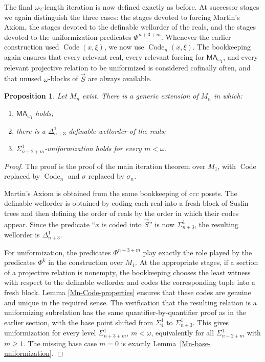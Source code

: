 \documentclass[a4paper,11pt]{article}
\newtheorem{proposition}[theorem]{Proposition}
\newcommand{\MA}{\mathsf{MA_{\omega_1}}}
\begin{document}
The final $\omega_2$-length iteration is now defined exactly as before. At
successor stages we again distinguish the three cases: the stages devoted to
forcing Martin's Axiom, the stages devoted to the definable wellorder of the
reals, and the stages devoted to the uniformization predicates
$\Phi^{n+3+m}$. Whenever the earlier construction used
$\operatorname{Code}(x,\xi)$, we now use $\operatorname{Code}_n(x,\xi)$.
The bookkeeping again ensures that every relevant real, every relevant
forcing for $\MA$, and every relevant projective relation to be uniformized
is considered cofinally often, and that unused $\omega$-blocks of
$\vec S$ are always available.

\begin{proposition}\label{Mn-final-extension}
Let $M_n$ exist. There is a generic extension of $M_n$ in which:
\begin{enumerate}
    \item $\MA$ holds;
    \item there is a $\Delta^1_{n+3}$-definable wellorder of the reals;
    \item $\Sigma^1_{n+2+m}$-uniformization holds for every $m<\omega$.
\end{enumerate}
\end{proposition}

\begin{proof}
The proof is the proof of the main iteration theorem over $M_1$, with
$\operatorname{Code}$ replaced by $\operatorname{Code}_n$ and
$\sigma$ replaced by $\sigma_n$.

Martin's Axiom is obtained from the same bookkeeping of ccc posets. The
definable wellorder is obtained by coding each real into a fresh block of
Suslin trees and then defining the order of reals by the order in which their
codes appear. Since the predicate ``$x$ is coded into $\vec S$'' is now
$\Sigma^1_{n+3}$, the resulting wellorder is $\Delta^1_{n+3}$.

For uniformization, the predicates $\Phi^{n+3+m}$ play exactly the role
played by the predicates $\Phi^k$ in the construction over $M_1$. At the
appropriate stages, if a section of a projective relation is nonempty, the
bookkeeping chooses the least witness with respect to the definable wellorder
and codes the corresponding tuple into a fresh block. Lemma
\ref{Mn-Code-properties} ensures that these codes are genuine and unique in
the required sense. The verification that the resulting relation is a
uniformizing subrelation has the same quantifier-by-quantifier proof as in
the earlier section, with the base point shifted from $\Sigma^1_4$ to
$\Sigma^1_{n+3}$. This gives uniformization for every level
$\Sigma^1_{n+3+m}$, $m<\omega$, equivalently for all
$\Sigma^1_{n+2+m}$ with $m\geq 1$. The missing base case $m=0$ is exactly
Lemma~\ref{Mn-base-uniformization}.
\end{proof}
\end{document}
